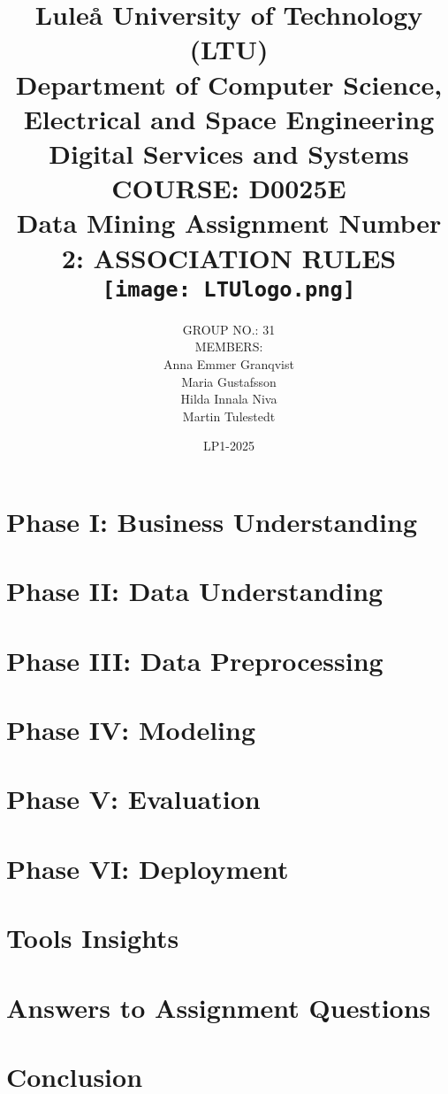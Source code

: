 \documentclass[12pt,a4paper]{report}
\title{
    {\large Luleå University of Technology (LTU)}\\
    {\large Department of Computer Science, Electrical and Space Engineering}\\
    {\large Digital Services and Systems}\\
    {\large COURSE: D0025E}\\
    {Data Mining Assignment Number 2: ASSOCIATION RULES}\\
    {\centering\texttt{[image: LTUlogo.png]}}\\
}
\author{
    GROUP NO.: 31\\
    \vspace{0.3cm}
    MEMBERS:\\
    Anna Emmer Granqvist\\
    Maria Gustafsson\\
    Hilda Innala Niva\\
    Martin Tulestedt
}
\date{LP1-2025}
\begin{document}
\maketitle




\tableofcontents

\chapter{Phase I: Business Understanding}


\chapter{Phase II: Data Understanding}


\chapter{Phase III: Data Preprocessing}


\chapter{Phase IV: Modeling}


\chapter{Phase V: Evaluation}


\chapter{Phase VI: Deployment}


\chapter{Tools Insights}



\chapter{Answers to Assignment Questions}



\chapter{Conclusion}


\printbibliography
\end{document}
